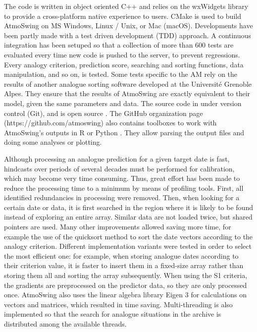 \documentclass[review]{elsarticle}
\begin{document}
The code is written in object oriented C++ and relies on the wxWidgets \citep{Smart2006} library to provide a cross-platform native experience to users. CMake is used to build AtmoSwing on MS Windows, Linux / Unix, or Mac (macOS). Developments have been partly made with a test driven development (TDD) approach. A continuous integration has been setuped so that a collection of more than 600 tests are evaluated every time new code is pushed to the server, to prevent regressions. Every analogy criterion, prediction score, searching and sorting functions, data manipulation, and so on, is tested. Some tests specific to the AM rely on the results of another analogue sorting software developed at the Universit\'{e} Grenoble Alpes. They ensure that the results of AtmoSwing are exactly equivalent to their model, given the same parameters and data. The source code in under version control (Git), and is open source \citep[on GitHub, www.atmoswing.org,][]{Horton2018c}. The GitHub organization page (https://github.com/atmoswing) also contains toolboxes to work with AtmoSwing's outputs in R \citep{Horton2018d} or Python \citep{Horton2018e}. They allow parsing the output files and doing some analyses or plotting.

Although processing an analogue prediction for a given target date is fast, hindcasts over periods of several decades must be performed for calibration, which may become very time consuming. Thus, great effort has been made to reduce the processing time to a minimum by means of profiling tools. First, all identified redundancies in processing were removed. Then, when looking for a certain date or data, it is first searched in the region where it is likely to be found instead of exploring an entire array. Similar data are not loaded twice, but shared pointers are used. Many other improvements allowed saving more time, for example the use of the quicksort method \citep{Hoare1962a} to sort the date vectors according to the analogy criterion. Different implementation variants were tested in order to select the most efficient one: for example, when storing analogue dates according to their criterion value, it is faster to insert them in a fixed-size array rather than storing them all and sorting the array subsequently. When using the S1 criteria, the gradients are preprocessed on the predictor data, so they are only processed once. AtmoSwing also uses the linear algebra library Eigen 3 \citep{Guennebaud2010} for calculations on vectors and matrices, which resulted in time saving. Multi-threading is also implemented so that the search for analogue situations in the archive is distributed among the available threads.
\end{document}
